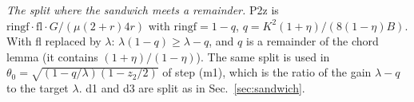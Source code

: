 

\emph{The split where the sandwich meets a remainder.}
P2z is $\mathrm{ringf}\cdot\mathrm{fl}\cdot G/(\mu(2+r)4r)$ with $\mathrm{ringf}=1-q$, $q=K^2(1+\eta)/(8(1-\eta)B)$.
With fl replaced by $\lambda$: $\lambda(1-q)\ge\lambda-q$, and $q$ is a remainder of the chord lemma (it contains $(1+\eta)/(1-\eta)$).
The same split is used in $\theta_0=\sqrt{(1-q/\lambda)(1-z_2/2)}$ of step (m1), which is the ratio of the gain $\lambda-q$ to the target $\lambda$.
d1 and d3 are split as in Sec.~\ref{sec:sandwich}.
